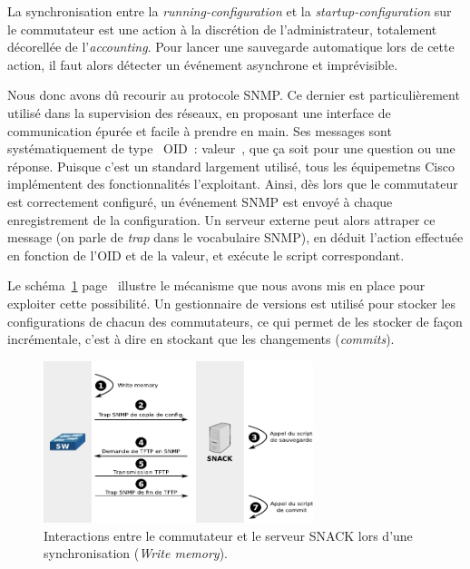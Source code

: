 La synchronisation entre la \emph{running-configuration} et la \emph{startup-configuration} sur le commutateur est une action à la discrétion de l'administrateur, totalement décorellée de l'\emph{accounting}. Pour lancer une sauvegarde automatique lors de cette action, il faut alors détecter un événement asynchrone et imprévisible.

Nous donc avons dû recourir au protocole SNMP. Ce dernier est particulièrement utilisé dans la supervision des réseaux, en proposant une interface de communication épurée et facile à prendre en main. Ses messages sont systématiquement de type \og~OID~: valeur~\fg, que ça soit pour une question ou une réponse. Puisque c'est un standard largement utilisé, tous les équipemetns Cisco implémentent des fonctionnalités l'exploitant. Ainsi, dès lors que le commutateur est correctement configuré, un événement SNMP est envoyé à chaque enregistrement de la configuration. Un serveur externe peut alors attraper ce message (on parle de \emph{trap} dans le vocabulaire SNMP), en déduit l'action effectuée en fonction de l'OID et de la valeur, et exécute le script correspondant.

Le schéma~\ref{schema_wrmem} page~\pageref{schema_wrmem} illustre le mécanisme que nous avons mis en place pour exploiter cette possibilité. Un gestionnaire de versions est utilisé pour stocker les configurations de chacun des commutateurs, ce qui permet de les stocker de façon incrémentale, c'est à dire en stockant que les changements (\emph{commits}).

\begin{figure}[!h]
	\begin{center}
	    \includegraphics[width=0.7\textwidth]{img/wrmem.pdf}
	\end{center}
	\caption{Interactions entre le commutateur et le serveur SNACK lors d'une synchronisation (\emph{Write memory}).}
	\label{schema_wrmem}
\end{figure}

